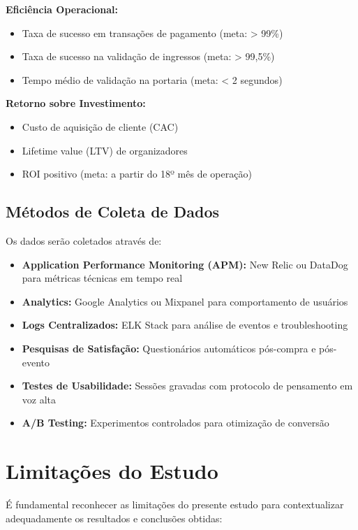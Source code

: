 \textbf{Eficiência Operacional:}
\begin{itemize}
    \item Taxa de sucesso em transações de pagamento (meta: > 99\%)
    \item Taxa de sucesso na validação de ingressos (meta: > 99,5\%)
    \item Tempo médio de validação na portaria (meta: < 2 segundos)
\end{itemize}

\textbf{Retorno sobre Investimento:}
\begin{itemize}
    \item Custo de aquisição de cliente (CAC)
    \item Lifetime value (LTV) de organizadores
    \item ROI positivo (meta: a partir do 18º mês de operação)
\end{itemize}

\subsection{Métodos de Coleta de Dados}

Os dados serão coletados através de:

\begin{itemize}
    \item \textbf{Application Performance Monitoring (APM):} New Relic ou DataDog para métricas técnicas em tempo real
    \item \textbf{Analytics:} Google Analytics ou Mixpanel para comportamento de usuários
    \item \textbf{Logs Centralizados:} ELK Stack para análise de eventos e troubleshooting
    \item \textbf{Pesquisas de Satisfação:} Questionários automáticos pós-compra e pós-evento
    \item \textbf{Testes de Usabilidade:} Sessões gravadas com protocolo de pensamento em voz alta
    \item \textbf{A/B Testing:} Experimentos controlados para otimização de conversão
\end{itemize}

\section{Limitações do Estudo}

É fundamental reconhecer as limitações do presente estudo para contextualizar adequadamente os resultados e conclusões obtidas:

